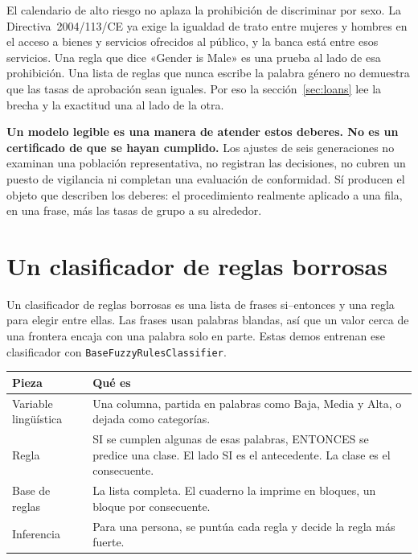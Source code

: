 \documentclass[11pt]{article}
\newcommand{\fn}[1]{\texttt{\small #1}}
\begin{document}
El calendario de alto riesgo no aplaza la prohibición de discriminar por sexo. La Directiva~2004/113/CE ya exige la igualdad de trato entre mujeres y hombres en el acceso a bienes y servicios ofrecidos al público, y la banca está entre esos servicios. Una regla que dice «Gender is Male» es una prueba al lado de esa prohibición. Una lista de reglas que nunca escribe la palabra género no demuestra que las tasas de aprobación sean iguales. Por eso la sección~\ref{sec:loans} lee la brecha y la exactitud una al lado de la otra.

\begin{careful}
\textbf{Un modelo legible es una manera de atender estos deberes. No es un certificado de que se hayan cumplido.} Los ajustes de seis generaciones no examinan una población representativa, no registran las decisiones, no cubren un puesto de vigilancia ni completan una evaluación de conformidad. Sí producen el objeto que describen los deberes: el procedimiento realmente aplicado a una fila, en una frase, más las tasas de grupo a su alrededor.
\end{careful}

\section{Un clasificador de reglas borrosas}
\label{sec:rules}

Un clasificador de reglas borrosas es una lista de frases si--entonces y una regla para elegir entre ellas. Las frases usan palabras blandas, así que un valor cerca de una frontera encaja con una palabra solo en parte. Estas demos entrenan ese clasificador con \fn{BaseFuzzyRulesClassifier}.

\begin{table}[H]
\centering
\small
\begin{tabularx}{\textwidth}{@{}l Y@{}}
\toprule
Pieza & Qué es \\
\midrule
Variable lingüística & Una columna, partida en palabras como Baja, Media y Alta, o dejada como categorías. \\
Regla & SI se cumplen algunas de esas palabras, ENTONCES se predice una clase. El lado SI es el antecedente. La clase es el consecuente. \\
Base de reglas & La lista completa. El cuaderno la imprime en bloques, un bloque por consecuente. \\
Inferencia & Para una persona, se puntúa cada regla y decide la regla más fuerte. \\
\bottomrule
\end{tabularx}
\end{table}
\end{document}
